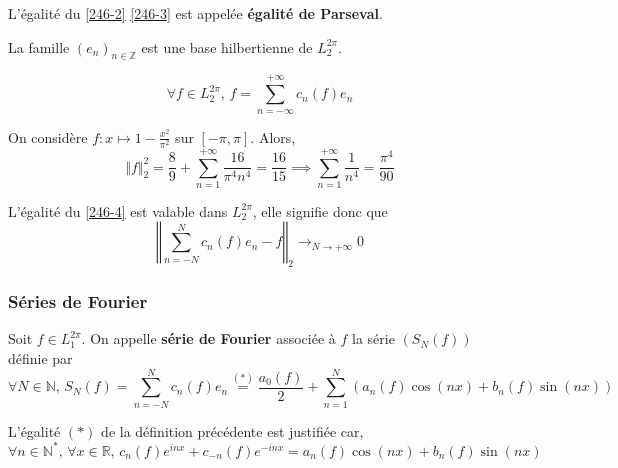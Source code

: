   \begin{remark}
    L'égalité du \cref{246-2} \cref{246-3} est appelée \textbf{égalité de Parseval}.
  \end{remark}


  \begin{theorem}
    La famille $(e_n)_{n \in \mathbb{Z}}$ est une base hilbertienne de $L_2^{2 \pi}$.
  \end{theorem}

  \begin{corollary}
    \label{246-4}
    \[ \forall f \in L_2^{2 \pi}, \, f = \sum_{n = -\infty}^{+\infty} c_n(f) e_n \]
  \end{corollary}


  \begin{example}
    \label{246-5}
    On considère $f : x \mapsto 1 - \frac{x^2}{\pi^2}$ sur $[-\pi, \pi]$. Alors,
    \[ \Vert f \Vert^2_2 = \frac{8}{9} + \sum_{n=1}^{+\infty} \frac{16}{\pi^4 n^4} = \frac{16}{15} \implies \sum_{n=1}^{+\infty} \frac{1}{n^4} = \frac{\pi^4}{90} \]
  \end{example}


  \begin{remark}
    L'égalité du \cref{246-4} est valable dans $L_2^{2\pi}$, elle signifie donc que
    \[ \left\Vert \sum_{n = -N}^{N} c_n(f) e_n - f \right\Vert_2 \longrightarrow_{N \rightarrow +\infty} 0 \]
  \end{remark}

  \subsubsection{Séries de Fourier}


  \begin{definition}
    Soit $f \in L_1^{2\pi}$. On appelle \textbf{série de Fourier} associée à $f$ la série $(S_N(f))$ définie par
    \[ \forall N \in \mathbb{N}, \, S_N(f) = \sum_{n=-N}^{N} c_n(f) e_n \overset{(*)}{=} \frac{a_0(f)}{2} + \sum_{n = 1}^N (a_n(f) \cos(nx) + b_n(f) \sin(nx)) \]
  \end{definition}

  \begin{remark}
    L'égalité $(*)$ de la définition précédente est justifiée car,
    \[ \forall n \in \mathbb{N}^*, \, \forall x \in \mathbb{R}, \, c_n(f) e^{inx} + c_{-n}(f) e^{-inx} = a_n(f) \cos(nx) + b_n(f) \sin(nx) \]
  \end{remark}


